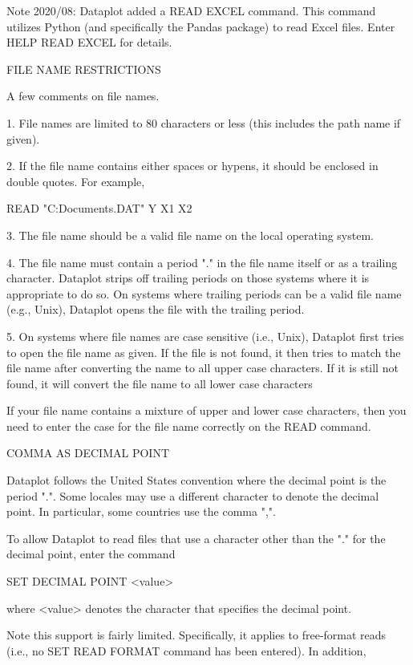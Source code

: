 Note 2020/08: Dataplot added a READ EXCEL command.  This command
utilizes Python (and specifically the Pandas package) to read Excel
files.  Enter HELP READ EXCEL for details.

FILE NAME RESTRICTIONS

A few comments on file names.

  1. File names are limited to 80 characters or less (this includes
     the path name if given).

  2. If the file name contains either spaces or hypens, it
     should be enclosed in double quotes.  For example,

       READ "C:\My Documents\SAMPLE.DAT"  Y X1 X2

  3. The file name should be a valid file name on the local
     operating system.

  4. The file name must contain a period "." in the file name itself
     or as a trailing character.  Dataplot strips off trailing periods
     on those systems where it is appropriate to do so.  On systems
     where trailing periods can be a valid file name (e.g., Unix),
     Dataplot opens the file with the trailing period.
 
  5. On systems where file names are case sensitive (i.e., Unix),
     Dataplot first tries to open the file name as given.  If the
     file is not found, it then tries to match the file name
     after converting the name to all upper case characters.  If
     it is still not found, it will convert the file name to all
     lower case characters

     If your file name contains a mixture of upper and lower case
     characters, then you need to enter the case for the file name
     correctly on the READ command.


COMMA AS DECIMAL POINT

Dataplot follows the United States convention where the decimal
point is the period ".".  Some locales may use a different
character to denote the decimal point.  In particular, some
countries use the comma ",".

To allow Dataplot to read files that use a character other than
the "." for the decimal point, enter the command

     SET DECIMAL POINT <value>

where <value> denotes the character that specifies the decimal
point.

Note this support is fairly limited.  Specifically, it applies
to free-format reads (i.e., no SET READ FORMAT command has been
entered).  In addition,

